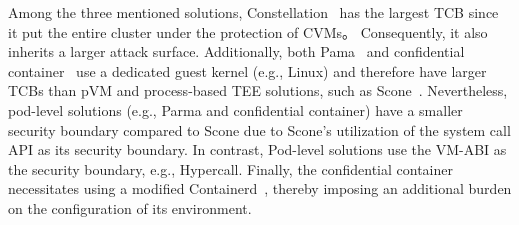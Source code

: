  
Among the three mentioned solutions, Constellation~\cite*{Constellation} has the largest \acrshort{TCB} since it put the entire cluster under the protection of \acrshort{CVM}s。 Consequently, it also inherits a larger attack surface. Additionally, both Pama~\cite*{Johnson2023ParmaCC} and confidential 
container~\cite*{confidential_kata} use a dedicated guest kernel (e.g., Linux) and therefore have larger \acrshort{TCB}s than pVM and process-based TEE solutions, such as Scone~\cite*{10.5555/3026877.3026930}. Nevertheless, pod-level solutions (e.g., Parma and confidential container) have a 
smaller security boundary compared to Scone due to Scone's utilization of the system call API as its security boundary. In contrast, Pod-level solutions use the VM-ABI as the security boundary, e.g., Hypercall. Finally, the confidential container necessitates using a modified 
Containerd~\cite*{containerd}, thereby imposing an additional burden on the configuration of its environment.



\cleardoublepage

